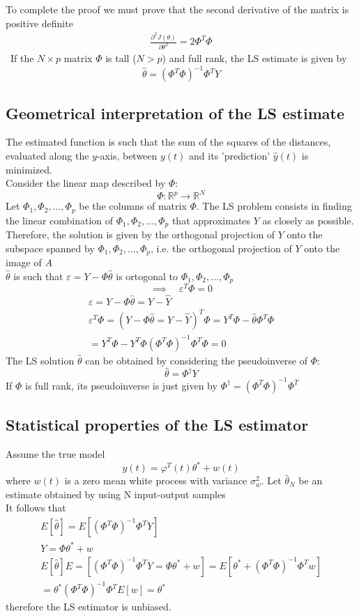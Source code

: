 \documentclass{book}
\theoremstyle{definition}
\theoremstyle{remark}
\theoremstyle{remark}
\begin{document}
To complete the proof we must prove that the second derivative of the matrix is positive definite 
\begin{gather*}
    \frac{\partial^2 J(\theta)}{\partial\theta^2}=2\Phi^T\Phi
\end{gather*}\
If the $N \times p$ matrix $\Phi$ is tall ($N>p$) and full rank, the LS estimate is given by
\begin{equation}
    \hat{\theta} = (\Phi^T\Phi)^{-1}\Phi^TY
\end{equation}



\subsection{Geometrical interpretation of the LS estimate}
The estimated function is such that the sum of the squares of the distances, evaluated along the $y$-axis, between $y(t)$ and its 'prediction' $\hat{y}(t)$ is minimized.\\
Consider the linear map described by $\Phi$:
\[
    \Phi : \mathbb{R}^p\to\mathbb{R}^N
\]
Let $\Phi_1,\Phi_2,\dots,\Phi_p$ be the columns of matrix $\Phi$. The LS problem consists in finding the linear combination of $\Phi_1,\Phi_2,\dots,\Phi_p$ that approximates $Y$ as closely as possible. Therefore, the solution is given by the orthogonal projection of $Y$ onto the subspace spanned by $\Phi_1,\Phi_2,\dots,\Phi_p$, i.e. the orthogonal projection of $Y$ onto the image of $A$
\\$\hat{\theta}$ is such that $\varepsilon=Y-\Phi\hat{\theta}$ is ortogonal to $\Phi_1,\Phi_2,\dots,\Phi_p$
\[
    \implies \quad \varepsilon^T\Phi = 0
\]
\begin{gather*}
    \varepsilon = Y-\Phi\hat{\theta}=Y-\hat{Y}\\
    \varepsilon^T\Phi=(Y-\Phi\hat{\theta}=Y-\hat{Y})^T\Phi=Y^T\Phi-\hat{\theta}\Phi^T\Phi\\
    =Y^T\Phi-Y^T\Phi(\Phi^T\Phi)^{-1}\Phi^T\Phi = 0
\end{gather*}
The LS solution $\hat{\theta}$ can be obtained by considering the pseudoinverse of $\Phi$:
\[
    \hat{\theta} = \Phi^\dagger Y
\]
If $\Phi$ is  full rank, its pseudoinverse is just given by $\Phi^\dagger = (\Phi^T\Phi)^{-1}\Phi^T$
\subsection{Statistical properties of the LS estimator}
Assume the true model
\[
    y(t)=\varphi^T(t)\theta^* + w(t)
\]
where $w(t)$ is a zero mean white process with variance $\sigma_w^2$. Let $\hat{\theta}_N$ be an estimate obtained by using N input-output samples\\
It follows that
\begin{gather*}
    E[\hat{\theta}] = E[(\Phi^T\Phi)^{-1}\Phi^TY]\\
    Y=\Phi\theta^*+w\\
    E[\hat{\theta}]E=[(\Phi^T\Phi)^{-1}\Phi^TY=\Phi\theta^*+w]=E[\theta^*+(\Phi^T\Phi)^{-1}\Phi^Tw]\\
    =\theta^*(\Phi^T\Phi)^{-1}\Phi^TE[w]=\theta^*
\end{gather*}
therefore the LS estimator is unbiased.
\end{document}
